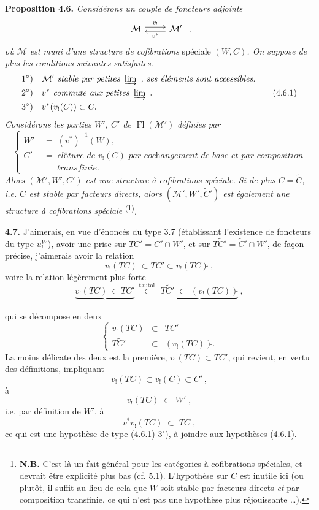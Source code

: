 \documentclass[11pt]{article}
\newcommand{\printedpage}[1]{\marginpar{\footnotesize p.~#1}}
\newcommand{\msp}[1]{\marginpar{\footnotesize [#1]}}
\newcommand{\Fl}{\operatorname{Fl}}
\newcommand{\postilde}{\tilde{}}
\begin{document}
\textbf{Proposition 4.6.} \textit{Considérons un couple de foncteurs adjoints}
\[
\begin{tikzcd}
\mathcal{M} \arrow[r, shift left, "v_!"] & \mathcal{M}' \arrow[l, shift left, "v^*"]
\end{tikzcd}
\ ,
\]
\textit{où $\mathcal{M}$ est muni d'une structure de cofibrations} spéciale $(W, C)$\textit{. On suppose de plus les conditions suivantes satisfaites.}
\[
\begin{aligned}
&1^\circ)\quad \mathcal{M}' \textit{ stable par petites } \varinjlim\ \textit{, ses éléments sont accessibles.} \\
&2^\circ)\quad v^* \textit{ commute aux petites } \varinjlim\ . \\
&3^\circ)\quad v^*(v_!(C)) \subset C.
\end{aligned} \tag*{(4.6.1)}
\]
\msp{page 79}
\textit{Considérons les parties $W'$, $C'$ de} $\Fl(\mathcal{M}')$ \textit{définies par}
\[
\left\{
\begin{aligned}
W' \;&=\; (v^*)^{-1}(W), \\
C' \;&=\; \textit{clôture de } v_!(C) \textit{ par cochangement de base et par composition} \\
&\phantom{\;=\;}\ \textit{transfinie.}
\end{aligned}
\right. \tag*{(4.6.2)}
\]
\textit{Alors $(\mathcal{M}', W', C')$ est une structure à cofibrations spéciale. Si de plus $C = \tilde{C}$, i.e. $C$ est stable par facteurs directs, alors $(\mathcal{M}', W', \tilde{C}')$ est également une structure à cofibrations spéciale} \textsuperscript{(}\footnote[20]{\textbf{N.B.} C'est là un fait général pour les catégories à cofibrations spéciales, et devrait être explicité plus bas (cf. 5.1). L'hypothèse sur $C$ est inutile ici (ou plutôt, il suffit au lieu de cela que $W$ soit stable par facteurs directs \textit{et} par composition transfinie, ce qui n'est pas une hypothèse plus réjouissante \dots).}\textsuperscript{)}.

\textbf{4.7.} J'aimerais, en vue d'énoncés du type 3.7 (établissant l'existence de foncteurs du type $u_!^W$), avoir une prise sur $TC' = C'{\cap}W'$, et sur $T\tilde{C}' = \tilde{C}'{\cap}W'$, de façon précise, j'aimerais avoir la relation
\[
v_!(TC)\ \subset TC' \subset v_!(TC)\postilde\ , \tag*{(4.7.1)}
\]
voire la relation légèrement plus forte
\[
\underbrace{v_!(TC)\ \subset TC'}_{} \ \overset{\text{tautol.}}{\subset}\ \underbrace{T\tilde{C}' \;\subset\; (v_!(TC))\postilde}_{}\ , \tag*{(4.7.2)}
\]

\printedpage{39}
qui se décompose en deux
\[
\left\{
\begin{array}{rcl}
v_{!}(TC) & \subset & TC' \\
T\tilde{C}' & \subset & (v_{!}(TC))\tilde{}.
\end{array}
\right.
\tag*{(4.7.3)}
\]
La moins délicate des deux est la \msp{page 80} première, $v_{!}(TC) \subset TC'$, qui revient, en vertu des définitions, impliquant
\[
v_{!}(TC) \subset v_{!}(C) \subset C' \, ,
\]
à
\[
v_{!}(TC) \;\subset\; W' \; ,
\]
i.e. par définition de $W'$, à
\[
v^{*}v_{!}(TC) \;\subset\; TC \; ,
\tag*{(4.7.4)}
\]
ce qui est une hypothèse de type (4.6.1) $3^{\circ}$), à joindre aux hypothèses (4.6.1).
\end{document}
